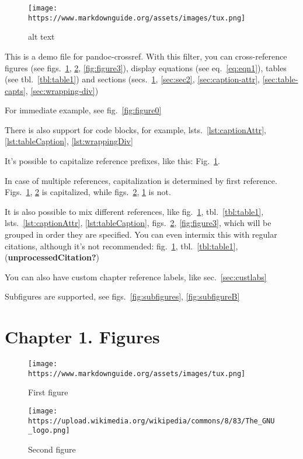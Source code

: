 \begin{figure}
\centering
\texttt{[image: https://www.markdownguide.org/assets/images/tux.png]}
\caption{alt text}
\end{figure}

This is a demo file for pandoc-crossref. With this filter, you can
cross-reference figures (see
figs.~\ref{fig:figure1}, \ref{fig:figure2}, \ref{fig:figure3}), display
equations (see eq.~\ref{eq:eqn1}), tables (see tbl.~\ref{tbl:table1}) and
sections
(secs.~\ref{sec:sec1}, \ref{sec:sec2}, \ref{sec:caption-attr}, \ref{sec:table-capts}, \ref{sec:wrapping-div})

For immediate example, see fig.~\ref{fig:figure0}

There is also support for code blocks, for example,
lsts.~\ref{lst:captionAttr}, \ref{lst:tableCaption}, \ref{lst:wrappingDiv}

It's possible to capitalize reference prefixes, like this:
Fig.~\ref{fig:figure1}.

In case of multiple references, capitalization is determined by first reference.
Figs.~\ref{fig:figure1}, \ref{fig:figure2} is capitalized, while
figs.~\ref{fig:figure2}, \ref{fig:figure1} is not.

It is also possible to mix different references, like fig.~\ref{fig:figure1},
tbl.~\ref{tbl:table1}, lsts.~\ref{lst:captionAttr}, \ref{lst:tableCaption},
figs.~\ref{fig:figure2}, \ref{fig:figure3}, which will be grouped in order they
are specified. You can even intermix this with regular citations, although it's
not recommended: fig.~\ref{fig:figure1}, tbl.~\ref{tbl:table1},
(\textbf{unprocessedCitation?})

You can also have custom chapter reference labels, like sec.~\ref{sec:custlabs}

Subfigures are supported, see figs.~\ref{fig:subfigures}, \ref{fig:subfigureB}

\hypertarget{sec:sec1}{%
\section{Chapter 1. Figures}\label{sec:sec1}}

\begin{figure}
\hypertarget{fig:figure1}{%
\centering
\texttt{[image: https://www.markdownguide.org/assets/images/tux.png]}
\caption{First figure}\label{fig:figure1}
}
\end{figure}

\begin{figure}
\hypertarget{fig:figure2}{%
\centering
\texttt{[image: https://upload.wikimedia.org/wikipedia/commons/8/83/The\_GNU\_logo.png]}
\caption{Second figure}\label{fig:figure2}
}
\end{figure}


